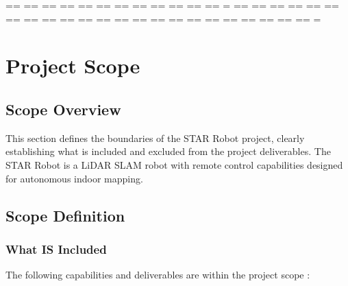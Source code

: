     == == == == == == == == == == == ==
    = %
      == == == == == == == == == == == == == == == == == == == == == == ==
    =

\section {
  Project Scope
}
\label {
sec:
  scope
}

\subsection{Scope Overview}

This section defines the boundaries of the STAR Robot project, clearly establishing what is included and excluded from the project deliverables. The STAR Robot is a LiDAR SLAM robot with remote control capabilities designed for autonomous indoor mapping.

\subsection{
  Scope Definition
}

\subsubsection{What IS Included}

        The following capabilities and deliverables are within the project scope
    :


